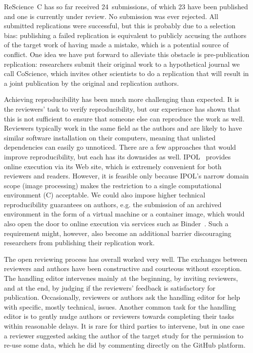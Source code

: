 \documentclass[runningheads]{llncs}
\begin{document}
ReScience~C has so far received 24~submissions, of which 23 have been published and one is currently under review. No submission was ever rejected. All submitted replications were successful, but this is probably due to a selection bias: publishing a failed replication is equivalent to publicly accusing the authors of the target work of having made a mistake, which is a potential source of conflict. One idea we have put forward to alleviate this obstacle is pre-publication replication: researchers submit their original work to a hypothetical journal we call CoScience, which invites other scientists to do a replication that will result in a joint publication by the original and replication authors.

Achieving reproducibility has been much more challenging than expected. It is the reviewers' task to verify reproducibility, but our experience has shown that this is not sufficient to ensure that someone else can reproduce the work as well. Reviewers typically work in the same field as the authors and are likely to have similar software installation on their computers, meaning that unlisted dependencies can easily go unnoticed. There are a few approaches that would improve reproducibility, but each has its downsides as well. IPOL~\cite{limareIPOLReviewedPublication2012} provides online execution via its Web site, which is extremely convenient for both reviewers and readers. However, it is feasible only because IPOL's narrow domain scope (image processing) makes the restriction to a single computational environment (C) acceptable. We could also impose higher technical reproducibility guarantees on authors, e.g. the submission of an archived environment in the form of a virtual machine or a container image, which would also open the door to online execution via services such as Binder~\cite{thebinderteamBinder2017}. Such a requirement might, however, also become an additional barrier discouraging researchers from publishing their replication work.

The open reviewing process has overall worked very well. The exchanges between reviewers and authors have been constructive and courteous without exception. The handling editor intervenes mainly at the beginning, by inviting reviewers, and at the end, by judging if the reviewers' feedback is satisfactory for publication. Occasionally, reviewers or authors ask the handling editor for help with specific, mostly technical, issues. Another common task for the handling editor is to gently nudge authors or reviewers towards completing their tasks within reasonable delays. It is rare for third parties to intervene, but in one case a reviewer suggested asking the author of the target study for the permission to re-use some data, which he did by commenting directly on the GitHub platform.
\end{document}
